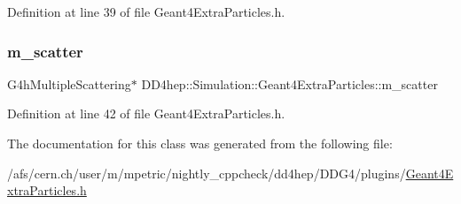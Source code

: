 Definition at line 39 of file Geant4\+Extra\+Particles.\+h.

\hypertarget{class_d_d4hep_1_1_simulation_1_1_geant4_extra_particles_ac682ea9380ab2726b966bd9829b279c4}{}\label{class_d_d4hep_1_1_simulation_1_1_geant4_extra_particles_ac682ea9380ab2726b966bd9829b279c4} 
\subsubsection{\texorpdfstring{m\+\_\+scatter}{m\_scatter}}
{\footnotesize\ttfamily G4h\+Multiple\+Scattering$\ast$ D\+D4hep\+::\+Simulation\+::\+Geant4\+Extra\+Particles\+::m\+\_\+scatter\hspace{0.3cm}{\ttfamily [private]}}



Definition at line 42 of file Geant4\+Extra\+Particles.\+h.



The documentation for this class was generated from the following file\+:\begin{DoxyCompactItemize}
\item 
/afs/cern.\+ch/user/m/mpetric/nightly\+\_\+cppcheck/dd4hep/\+D\+D\+G4/plugins/\hyperlink{_geant4_extra_particles_8h}{Geant4\+Extra\+Particles.\+h}\end{DoxyCompactItemize}
